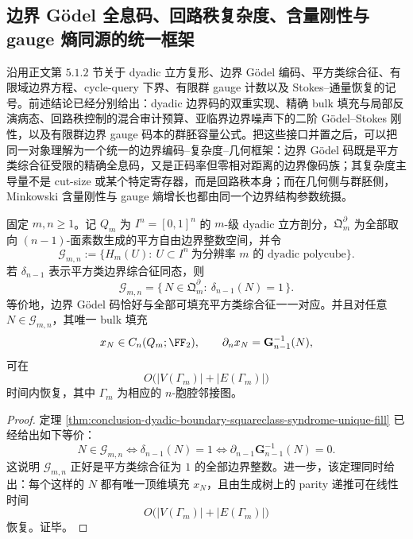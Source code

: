 \subsection{边界 Gödel 全息码、回路秩复杂度、含量刚性与 gauge 熵同源的统一框架}\label{subsec:conclusion-boundary-code-cycle-rank-gauge-content-unification}

沿用正文第 \(5.1.2\) 节关于 dyadic 立方复形、边界 Gödel 编码、平方类综合征、有限域边界方程、cycle-query 下界、有限群 gauge 计数以及 Stokes--通量恢复的记号。前述结论已经分别给出：dyadic 边界码的双重实现、精确 bulk 填充与局部反演病态、回路秩控制的混合审计预算、亚临界边界噪声下的二阶 Gödel--Stokes 刚性，以及有限群边界 gauge 码本的群胚容量公式。把这些接口并置之后，可以把同一对象理解为一个统一的边界编码--复杂度--几何框架：边界 Gödel 码既是平方类综合征受限的精确全息码，又是正码率但零相对距离的边界像码族；其复杂度主导量不是 cut-size 或某个特定寄存器，而是回路秩本身；而在几何侧与群胚侧，Minkowski 含量刚性与 gauge 熵增长也都由同一个边界结构参数统摄。

\begin{theorem}\label{thm:conclusion-boundary-godel-syndrome-completeness-linear-decode}
固定 \(m,n\ge 1\)。记 \(Q_m\) 为 \(I^n=[0,1]^n\) 的 \(m\)-级 dyadic 立方剖分，\(\mathfrak Q_m^{\partial}\) 为全部取向 \((n-1)\)-面素数生成的平方自由边界整数空间，并令
\[
\mathcal G_{m,n}
:=
\{H_m(U):\ U\subset I^n\ \text{为分辨率 }m\text{ 的 dyadic polycube}\}.
\]
若 \(\delta_{n-1}\) 表示平方类边界综合征同态，则
\[
\mathcal G_{m,n}
=
\{\,N\in \mathfrak Q_m^{\partial}:\ \delta_{n-1}(N)=1\,\}.
\]
等价地，边界 Gödel 码恰好与全部可填充平方类综合征一一对应。并且对任意 \(N\in\mathcal G_{m,n}\)，其唯一 bulk 填充
\[
x_N\in C_n(Q_m;\FF_2),
\qquad
\partial_n x_N=\mathbf G_{n-1}^{-1}(N),
\]
可在
\[
O\bigl(|V(\Gamma_m)|+|E(\Gamma_m)|\bigr)
\]
时间内恢复，其中 \(\Gamma_m\) 为相应的 \(n\)-胞腔邻接图。
\end{theorem}
\begin{proof}
定理 \ref{thm:conclusion-dyadic-boundary-squareclass-syndrome-unique-fill} 已经给出如下等价：
\[
N\in \mathcal G_{m,n}
\iff
\delta_{n-1}(N)=1
\iff
\partial_{n-1}\mathbf G_{n-1}^{-1}(N)=0.
\]
这说明 \(\mathcal G_{m,n}\) 正好是平方类综合征为 \(1\) 的全部边界整数。进一步，该定理同时给出：每个这样的 \(N\) 都有唯一顶维填充 \(x_N\)，且由生成树上的 parity 递推可在线性时间
\[
O\bigl(|V(\Gamma_m)|+|E(\Gamma_m)|\bigr)
\]
恢复。证毕。
\end{proof}

